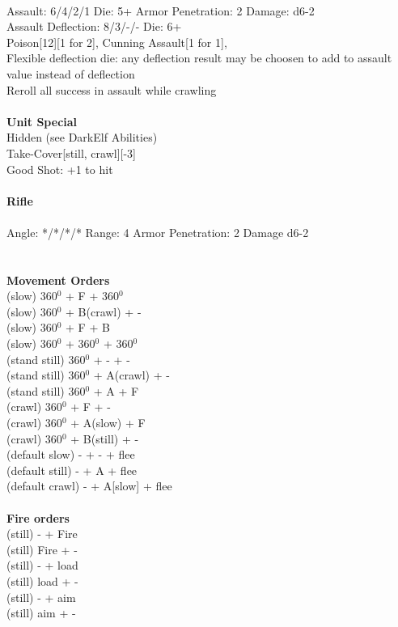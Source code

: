 \ \\
Assault: 6/4/2/1 Die: 5+ Armor Penetration: 2 Damage: d6-2 \\
Assault Deflection: 8/3/-/- Die: 6+\\
\indent Poison[12][1 for 2], Cunning Assault[1 for 1], \\ Flexible deflection die: any deflection result may be choosen to add to assault value instead of deflection\\ Reroll all success in assault while crawling \\
\ \\

{\bf Unit Special} \\
Hidden (see DarkElf Abilities)\\ Take-Cover[still, crawl][-3]\\ Good Shot: +1 to hit
\ \\
\ \\
{\bf Rifle } \\
\ \\
Angle: */*/*/* Range: 4 Armor Penetration: 2 Damage d6-2 \\
\indent  \\





\ \\ {\bf Movement Orders } \\
(slow) 360$^0$ + F + 360$^0$ \\
(slow) 360$^0$ + B(crawl) + - \\
(slow) 360$^0$ + F + B \\
(slow) 360$^0$ + 360$^0$ + 360$^0$ \\
(stand still) 360$^0$ + - + -  \\
(stand still) 360$^0$ + A(crawl) + - \\
(stand still) 360$^0$ + A + F \\
(crawl) 360$^0$ + F + - \\
(crawl) 360$^0$ + A(slow) + F \\
(crawl) 360$^0$ + B(still) + - \\
(default slow) - + - + flee \\
(default still) - + A + flee \\
(default crawl) - + A[slow] + flee \\
\ \\ {\bf Fire orders } \\
(still) - + Fire \\
(still) Fire + -  \\
(still) - + load \\
(still) load + - \\
(still) - + aim \\
(still) aim + -  \\



